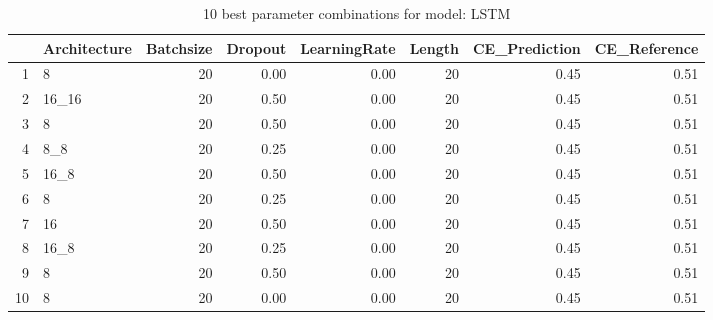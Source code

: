\begin{table}[ht]
\centering
\begin{tabular}{rlrrrrrr}
  \hline
 & Architecture & Batchsize & Dropout & LearningRate & Length & CE\_Prediction & CE\_Reference \\ 
  \hline
1 & 8 &  20 & 0.00 & 0.00 &  20 & 0.45 & 0.51 \\ 
  2 & 16\_16 &  20 & 0.50 & 0.00 &  20 & 0.45 & 0.51 \\ 
  3 & 8 &  20 & 0.50 & 0.00 &  20 & 0.45 & 0.51 \\ 
  4 & 8\_8 &  20 & 0.25 & 0.00 &  20 & 0.45 & 0.51 \\ 
  5 & 16\_8 &  20 & 0.50 & 0.00 &  20 & 0.45 & 0.51 \\ 
  6 & 8 &  20 & 0.25 & 0.00 &  20 & 0.45 & 0.51 \\ 
  7 & 16 &  20 & 0.50 & 0.00 &  20 & 0.45 & 0.51 \\ 
  8 & 16\_8 &  20 & 0.25 & 0.00 &  20 & 0.45 & 0.51 \\ 
  9 & 8 &  20 & 0.50 & 0.00 &  20 & 0.45 & 0.51 \\ 
  10 & 8 &  20 & 0.00 & 0.00 &  20 & 0.45 & 0.51 \\ 
   \hline
\end{tabular}
\caption{10 best parameter combinations for model: LSTM} 
\label{tab:LSTM_top_10}
\end{table}
